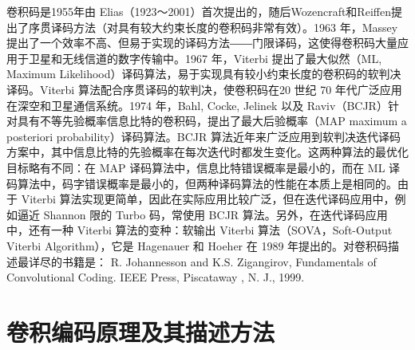 卷积码是1955年由 Elias（1923～2001）首次提出的，随后Wozencraft和Reiffen提出了序贯译码方法（对具有较大约束长度的卷积码非常有效）。1963 年，Massey 提出了一个效率不高、但易于实现的译码方法――门限译码，这使得卷积码大量应用于卫星和无线信道的数字传输中。1967 年，Viterbi 提出了最大似然（ML, Maximum Likelihood）译码算法，易于实现具有较小约束长度的卷积码的软判决译码。Viterbi 算法配合序贯译码的软判决，使卷积码在20 世纪 70 年代广泛应用在深空和卫星通信系统。1974 年，Bahl, Cocke, Jelinek 以及 Raviv（BCJR）针对具有不等先验概率信息比特的卷积码，提出了最大后验概率（MAP maximum a posteriori probability）译码算法。BCJR 算法近年来广泛应用到软判决迭代译码方案中，其中信息比特的先验概率在每次迭代时都发生变化。这两种算法的最优化目标略有不同：在 MAP 译码算法中，信息比特错误概率是最小的，而在 ML 译码算法中，码字错误概率是最小的，但两种译码算法的性能在本质上是相同的。由于 Viterbi 算法实现更简单，因此在实际应用比较广泛，但在迭代译码应用中，例如逼近 Shannon 限的 Turbo 码，常使用 BCJR 算法。另外，在迭代译码应用中，还有一种 Viterbi 算法的变种：软输出 Viterbi 算法（SOVA，Soft-Output Viterbi Algorithm），它是 Hagenauer 和 Hoeher 在 1989 年提出的。对卷积码描述最详尽的书籍是：
R. Johannesson and K.S. Zigangirov, Fundamentals of Convolutional Coding. IEEE Press, Piscataway , N. J., 1999.

\section{卷积编码原理及其描述方法}

